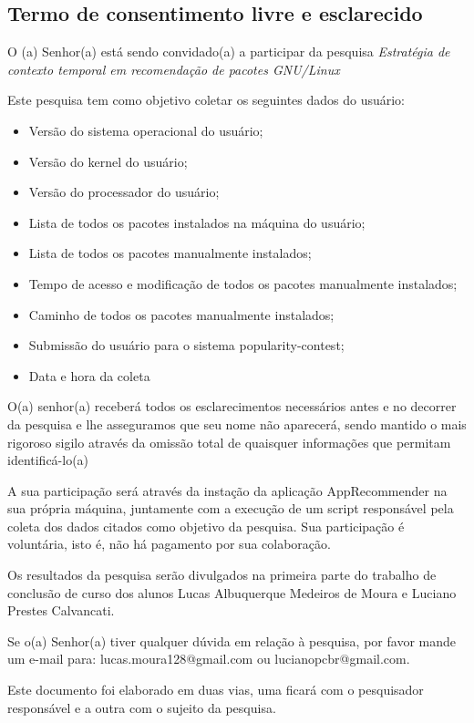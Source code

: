 \begin{anexosenv}
\chapter{Termo de consentimento livre e esclarecido}

O (a) Senhor(a) está sendo convidado(a) a participar da pesquisa
\textit{Estratégia de contexto temporal em recomendação de pacotes GNU/Linux}

Este pesquisa tem como objetivo coletar os seguintes dados do usuário:

\begin{itemize}
    \item Versão do sistema operacional do usuário;
    \item Versão do kernel do usuário;
    \item Versão do processador do usuário;
    \item Lista de todos os pacotes instalados na máquina do usuário;
    \item Lista de todos os pacotes manualmente instalados;
    \item Tempo de acesso e modificação de todos os pacotes manualmente instalados;
    \item Caminho de todos os pacotes manualmente instalados;
    \item Submissão do usuário para o sistema popularity-contest;
    \item Data e hora da coleta
\end{itemize}

O(a) senhor(a) receberá todos os esclarecimentos necessários antes e no decorrer da pesquisa e
lhe asseguramos que seu nome não aparecerá, sendo mantido o mais rigoroso sigilo através da omissão total de quaisquer
informações que permitam identificá-lo(a)

A sua participação será através da instação da aplicação AppRecommender na sua própria máquina,
juntamente com a execução de um script responsável pela coleta dos dados citados como objetivo da pesquisa.
Sua participação é voluntária, isto é, não há pagamento por sua colaboração.

Os resultados da pesquisa serão divulgados na primeira parte do trabalho de conclusão de curso
dos alunos Lucas Albuquerque Medeiros de Moura e Luciano Prestes Calvancati.

Se o(a) Senhor(a) tiver qualquer dúvida em relação à pesquisa, por
favor mande um e-mail para: lucas.moura128@gmail.com ou lucianopcbr@gmail.com.

Este documento foi elaborado em duas vias, uma ficará com o pesquisador responsável e
a outra com o sujeito da pesquisa.


\end{anexosenv}
